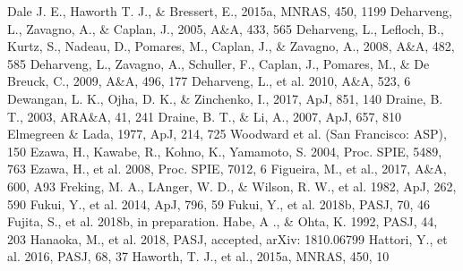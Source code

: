 \documentclass[onecolumn]{pasj01}
\begin{document}
{{{{{{\begin{thebibliography}{}
{Dale J. E., Haworth T. J., \&  Bressert, E., 2015a, MNRAS, 450, 1199}
Deharveng, L., Zavagno, A., \& Caplan, J., 2005, A\&A, 433, 565
Deharveng, L., Lefloch, B., Kurtz, S., Nadeau, D., Pomares, M., Caplan, J.,  \& Zavagno, A., 2008, A\&A, 482, 585
Deharveng, L., Zavagno, A., Schuller, F., Caplan, J., Pomares, M., \& De Breuck, C., 2009, A\&A, 496, 177
Deharveng, L., et al. 2010, A\&A, 523, 6
{ Dewangan, L. K., Ojha, D. K., \& Zinchenko, I., 2017, ApJ, 851, 140}
{Draine, B. T., 2003, ARA\&A, 41, 241}
{Draine, B. T., \& Li, A., 2007, ApJ, 657, 810}
Elmegreen \& Lada, 1977, ApJ,  214, 725
Woodward et al. (San Francisco: ASP), 150
Ezawa, H., Kawabe, R., Kohno, K., Yamamoto, S. 2004, Proc. SPIE, 5489, 763
Ezawa, H., et al. 2008, Proc. SPIE, 7012, 6
Figueira, M., et al.,  2017, A\&A, 600, A93
{ Freking, M. A., LAnger, W. D., \& Wilson, R. W., et al. 1982, ApJ, 262, 590}
Fukui, Y., et al. 2014, ApJ, 796, 59
Fukui, Y., et al. 2018b, PASJ, 70, 46
Fujita, S., et al. 2018b, in preparation.
Habe, A ., \& Ohta, K. 1992, PASJ, 44, 203
Hanaoka, M., et al. 2018, PASJ, accepted, arXiv: 1810.06799
Hattori, Y., et al. 2016, PASJ, 68, 37
Haworth, T. J., et al., 2015a, MNRAS, 450, 10

\end{thebibliography}}}}}}}
\end{document}

